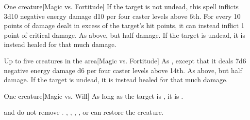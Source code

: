 \begin{spellheader}
    \spellrng{\rngclose}
\end{spellheader}
\begin{spelleffects}
    \begin{spelltarget}{One creature}[Magic vs. Fortitude]
        \spellsuccess If the target is not undead, this spell inflicts 3d10 negative energy damage \add d10 per four caster levels above 6th. For every 10 points of damage dealt in excess of the target's hit points, it can instead inflict 1 point of critical damage.
        \spellfailure As above, but half damage.
        \spelleffect If the target is undead, it is instead healed for that much damage.
    \end{spelltarget}
\end{spelleffects}

\begin{spellheader}
\end{spellheader}
\begin{spelleffects}
    \begin{spelltargets}{Up to five creatures in the area}[Magic vs. Fortitude]
        \spellsuccess As , except that it deals 7d6 negative energy damage \add d6 per four caster levels above 14th.
        \spellfailure As above, but half damage.
        \spelleffect If the target is undead, it is instead healed for that much damage.
    \end{spelltargets}
\end{spelleffects}

\begin{spellheader}
    \spellrng{\rngclose}
\end{spellheader}
\begin{spelleffects}
    \begin{spelltarget}{One creature}[Magic vs. Will]
        \spellsuccess As long as the target is \bloodied, it is \confused.
    \end{spelltarget}
\end{spelleffects}
\begin{spellfooter}
    \spellnotes {} and  do not remove . , , , , or  can restore the creature.
\end{spellfooter}

